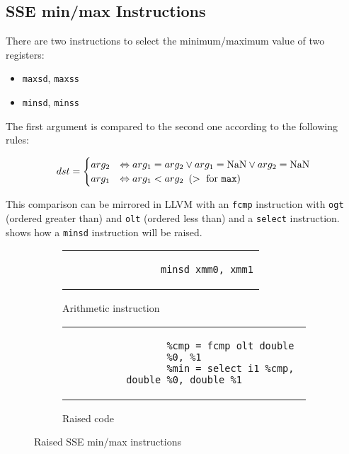 \subsection{SSE min/max Instructions}\label{subsec:sse-min/max-instructions}

There are two instructions to select the minimum/maximum value of two registers:

\begin{itemize}
    \item \texttt{maxsd}, \texttt{maxss}
    \item \texttt{minsd}, \texttt{minss}
\end{itemize}

The first argument is compared to the second one according to the following rules:

\[
    dst = \begin{cases}
              arg_2 & \Leftrightarrow arg_1 = arg_2 \lor arg_1 = \text{NaN} \lor arg_2 = \text{NaN} \\
              arg_1 & \Leftrightarrow arg_1 < arg_2 \text{ }\left(>\text{ for \texttt{max}}\right)
    \end{cases}
\]

This comparison can be mirrored in LLVM with an \texttt{fcmp} instruction with \texttt{ogt} (ordered greater than) and \texttt{olt} (ordered less than) and a \texttt{select} instruction.
 shows how a \texttt{minsd} instruction will be raised.

\begin{figure}[htpb]
    \centering
    \begin{subfigure}{.3\textwidth}
        \begin{tabular}{c}
            \begin{lstlisting}
                minsd xmm0, xmm1

            \end{lstlisting}
        \end{tabular}
        \caption{Arithmetic instruction}
    \end{subfigure}
    \hfill%
    \begin{subfigure}{.65\textwidth}
        \begin{tabular}{c}
            \begin{lstlisting}
                %cmp = fcmp olt double %0, %1
                %min = select i1 %cmp, double %0, double %1
            \end{lstlisting}
        \end{tabular}
        \caption{Raised code}
    \end{subfigure}
    \caption{Raised SSE min/max instructions}
    \label{fig:raised-fp-minmax}
\end{figure}


